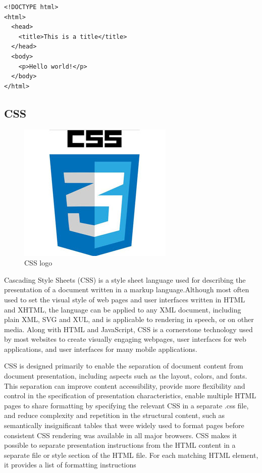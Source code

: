 \begin{verbatim}
<!DOCTYPE html>
<html>
  <head>
    <title>This is a title</title>
  </head>
  <body>
    <p>Hello world!</p>
  </body>
</html>

\end{verbatim}


\subsection{CSS}

\begin{figure}[h]
\centering \includegraphics[scale=0.50]{images/CSS.jpg}
\caption{CSS logo}
\end{figure}
Cascading Style Sheets (CSS) is a style sheet language used for describing the presentation of a document written in a markup language.Although most often used to set the visual style of web pages and user interfaces written in HTML and XHTML, the language can be applied to any XML document, including plain XML, SVG and XUL, and is applicable to rendering in speech, or on other media. Along with HTML and JavaScript, CSS is a cornerstone technology used by most websites to create visually engaging webpages, user interfaces for web applications, and user interfaces for many mobile applications.


CSS is designed primarily to enable the separation of document content from document presentation, including aspects such as the layout, colors, and fonts. This separation can improve content accessibility, provide more flexibility and control in the specification of presentation characteristics, enable multiple HTML pages to share formatting by specifying the relevant CSS in a separate .css file, and reduce complexity and repetition in the structural content, such as semantically insignificant tables that were widely used to format pages before consistent CSS rendering was available in all major browsers. CSS makes it possible to separate presentation instructions from the HTML content in a separate file or style section of the HTML file. For each matching HTML element, it provides a list of formatting instructions

